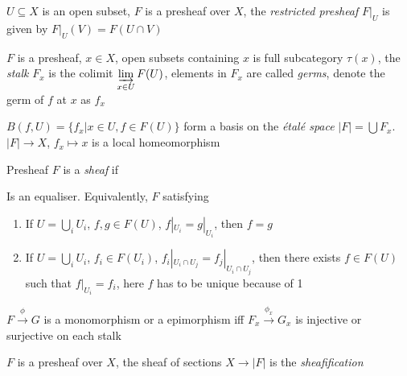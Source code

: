 \documentclass[main]{subfiles}
\begin{document}
\begin{definition}
$U\subseteq X$ is an open subset, $F$ is a presheaf over $X$, the \textit{restricted presheaf} $F|_U$ is given by $F|_U(V)=F(U\cap V)$
\end{definition}

\begin{definition}
$F$ is a presheaf, $x\in X$, open subsets containing $x$ is full subcategory $\tau(x)$, the \textit{stalk} $F_x$ is the colimit $\displaystyle\varinjlim_{x\in U}F(U)$, elements in $F_x$ are called \textit{germs}, denote the germ of $f$ at $x$ as $f_x$
\end{definition}

\begin{lemma}
$B(f,U)=\{f_x|x\in U,f\in F(U)\}$ form a basis on the \textit{\'etal\'e space} $|F|=\bigcup F_x$. $|F|\to X$, $f_x\mapsto x$ is a local homeomorphism
\end{lemma}

\begin{definition}\label{Sheaf}
Presheaf $F$ is a \textit{sheaf} if
\begin{center}
\end{center}
Is an equaliser. Equivalently, $F$ satisfying
\begin{enumerate}[{label=\textit{\arabic*.}}, align=left, leftmargin=*]
\item If $U=\bigcup_{i}U_i$, $f,g\in F(U)$, $f|_{U_i}=g|_{U_i}$, then $f=g$ 
\item If $U=\bigcup_{i}U_i$, $f_i\in F(U_i)$, $f_i|_{U_i\cap U_j}=f_j|_{U_i\cap U_j}$, then there exists $f\in F(U)$ such that $f|_{U_i}=f_i$, here $f$ has to be unique because of 1
\end{enumerate}
\end{definition}

\begin{proposition}
$F\xrightarrow\phi G$ is a monomorphism or a epimorphism iff $F_x\xrightarrow{\phi_x} G_x$ is injective or surjective on each stalk
\end{proposition}

\begin{definition}[Sheafification]
$F$ is a presheaf over $X$, the sheaf of sections $X\to |F|$ is the \textit{sheafification}
\end{definition}
\end{document}
